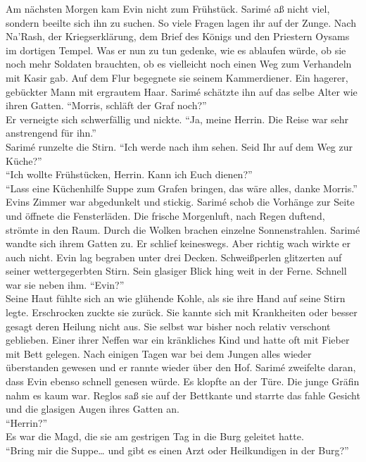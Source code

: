 Am nächsten Morgen kam Evin nicht zum Frühstück. Sarimé aß nicht viel, sondern beeilte sich ihn zu 
suchen. So viele Fragen lagen ihr auf der Zunge. Nach Na'Rash, der Kriegserklärung, dem Brief des 
Königs und den Priestern Oysams im dortigen Tempel. Was er nun zu tun gedenke, wie es ablaufen 
würde, ob sie noch mehr Soldaten brauchten, ob es vielleicht noch einen Weg zum Verhandeln mit 
Kasir 
gab. Auf dem Flur begegnete sie seinem Kammerdiener. Ein hagerer, gebückter Mann mit ergrautem 
Haar. Sarimé schätzte ihn auf das selbe Alter wie ihren Gatten. ``Morris, schläft der Graf noch?''\\
Er verneigte sich schwerfällig und nickte. ``Ja, meine Herrin. Die Reise war sehr anstrengend für 
ihn.''\\
Sarimé runzelte die Stirn. ``Ich werde nach ihm sehen. Seid Ihr auf dem Weg zur Küche?''\\
``Ich wollte Frühstücken, Herrin. Kann ich Euch dienen?''\\
``Lass eine Küchenhilfe Suppe zum Grafen bringen, das wäre alles, danke Morris.''\\
Evins Zimmer war abgedunkelt und stickig. Sarimé schob die Vorhänge zur Seite und öffnete die 
Fensterläden. Die frische Morgenluft, nach Regen duftend, strömte in den Raum. Durch die Wolken 
brachen einzelne Sonnenstrahlen. Sarimé wandte sich ihrem Gatten zu. Er schlief keineswegs. Aber 
richtig wach wirkte er auch nicht. Evin lag begraben unter drei Decken. Schweißperlen glitzerten 
auf seiner wettergegerbten Stirn. Sein glasiger Blick hing weit in der Ferne. Schnell war sie neben 
ihm. ``Evin?''\\
Seine Haut fühlte sich an wie glühende Kohle, als sie ihre Hand auf seine Stirn legte. Erschrocken 
zuckte sie zurück. Sie kannte sich mit Krankheiten oder besser gesagt deren Heilung nicht aus. Sie 
selbst war bisher noch relativ verschont geblieben. Einer ihrer Neffen war ein kränkliches Kind und 
hatte oft mit Fieber mit Bett gelegen. Nach einigen Tagen war bei dem Jungen alles wieder 
überstanden gewesen und er rannte wieder über den Hof. Sarimé zweifelte daran, dass Evin ebenso 
schnell genesen würde. Es klopfte an der Türe. Die junge Gräfin nahm es kaum war. Reglos saß sie 
auf der Bettkante und starrte das fahle Gesicht und die glasigen Augen ihres Gatten an.\\
``Herrin?''\\
Es war die Magd, die sie am gestrigen Tag in die Burg geleitet hatte.\\
``Bring mir die Suppe… und gibt es einen Arzt oder Heilkundigen in der Burg?''\\
